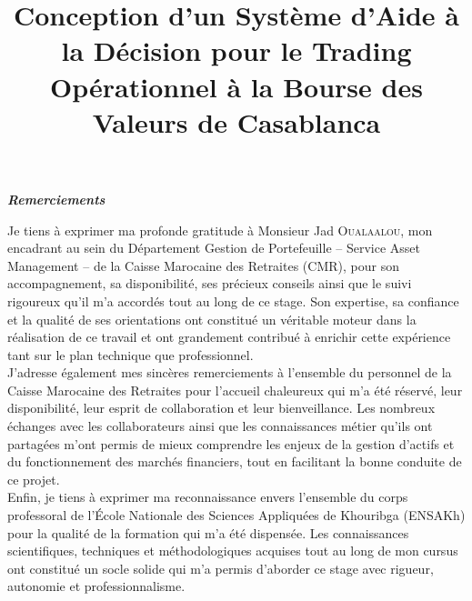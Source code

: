 \documentclass{rapportENSIAS} %
\title{Conception d'un Système d'Aide à la Décision pour le Trading Opérationnel à la Bourse des Valeurs de Casablanca}
\begin{document}

\fairemarges
\fairepagedegarde

\newpage
\thispagestyle{empty}
\mbox{}
\newpage

\thispagestyle{empty}
\vspace*{\fill}

\begin{center}
    {\LARGE \itshape \textbf{Remerciements}}
\end{center}

\vspace{1.5cm}

\begin{center}
\begin{minipage}{0.85\textwidth}

Je tiens à exprimer ma profonde gratitude à Monsieur Jad \textsc{Oualaalou}, mon encadrant au sein du Département Gestion de Portefeuille -- Service Asset Management -- de la Caisse Marocaine des Retraites (CMR), pour son accompagnement, sa disponibilité, ses précieux conseils ainsi que le suivi rigoureux qu'il m'a accordés tout au long de ce stage. Son expertise, sa confiance et la qualité de ses orientations ont constitué un véritable moteur dans la réalisation de ce travail et ont grandement contribué à enrichir cette expérience tant sur le plan technique que professionnel.\\

J'adresse également mes sincères remerciements à l'ensemble du personnel de la Caisse Marocaine des Retraites pour l'accueil chaleureux qui m'a été réservé, leur disponibilité, leur esprit de collaboration et leur bienveillance. Les nombreux échanges avec les collaborateurs ainsi que les connaissances métier qu'ils ont partagées m'ont permis de mieux comprendre les enjeux de la gestion d'actifs et du fonctionnement des marchés financiers, tout en facilitant la bonne conduite de ce projet.\\

Enfin, je tiens à exprimer ma reconnaissance envers l'ensemble du corps professoral de l'École Nationale des Sciences Appliquées de Khouribga (ENSAKh) pour la qualité de la formation qui m'a été dispensée. Les connaissances scientifiques, techniques et méthodologiques acquises tout au long de mon cursus ont constitué un socle solide qui m'a permis d'aborder ce stage avec rigueur, autonomie et professionnalisme.

\end{minipage}
\end{center}
\end{document}
